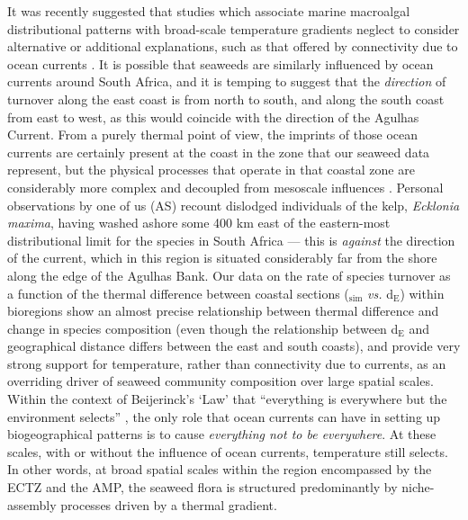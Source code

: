 \documentclass[utf8]{frontiersSCNS} %
\begin{document}
It was recently suggested that studies which associate marine macroalgal distributional patterns with broad-scale temperature gradients neglect to consider alternative or additional explanations, such as that offered by connectivity due to ocean currents \citep{Wernberg2013}. It is possible that seaweeds are similarly influenced by ocean currents around South Africa, and it is temping to suggest that the \emph{direction} of turnover along the east coast is from north to south, and along the south coast from east to west, as this would coincide with the direction of the Agulhas Current. From a purely thermal point of view, the imprints of those ocean currents are certainly present at the coast in the zone that our seaweed data represent, but the physical processes that operate in that coastal zone are considerably more complex and decoupled from mesoscale influences \citep{Schlegel2017}. Personal observations by one of us (AS) recount dislodged individuals of the kelp, \emph{Ecklonia maxima}, having washed ashore some 400 km east of the eastern-most distributional limit for the species in South Africa --- this is \emph{against} the direction of the current, which in this region is situated considerably far from the shore along the edge of the Agulhas Bank. Our data on the rate of species turnover as a function of the thermal difference between coastal sections (\textbeta$_{\text{sim}}$ \emph{vs.} d$_{\text{E}}$) within bioregions show an almost precise relationship between thermal difference and change in species composition (even though the relationship between d$_{\text{E}}$ and geographical distance differs between the east and south coasts), and provide very strong support for temperature, rather than connectivity due to currents, as an overriding driver of seaweed community composition over large spatial scales. Within the context of Beijerinck's `Law' that ``everything is everywhere but the environment selects'' \citep{deWit2006}, the only role that ocean currents can have in setting up biogeographical patterns is to cause \emph{everything not to be everywhere}. At these scales, with or without the influence of ocean currents, temperature still selects. In other words, at broad spatial scales within the region encompassed by the ECTZ and the AMP, the seaweed flora is structured predominantly by niche-assembly processes driven by a thermal gradient.
\end{document}
